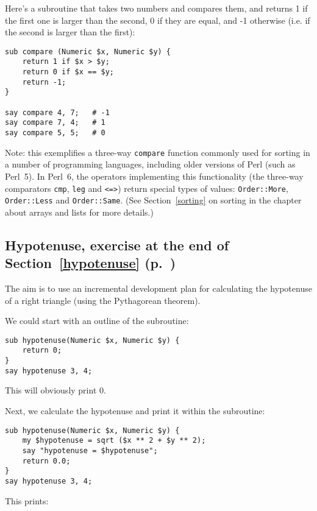 Here's a subroutine that takes two numbers and compares them, 
and returns 1 if the first one is larger than the second, 0 if 
they are equal, and -1 otherwise (i.e. if the second is larger 
than the first):

\begin{verbatim}
sub compare (Numeric $x, Numeric $y) {
    return 1 if $x > $y;
    return 0 if $x == $y;
    return -1;
}

say compare 4, 7;   # -1
say compare 7, 4;   # 1
say compare 5, 5;   # 0
\end{verbatim}

Note: this exemplifies a three-way {\tt compare} function 
commonly used for sorting in a number of programming 
languages, including older versions of Perl (such as 
Perl~5). In Perl~6, the operators implementing this 
functionality (the three-way comparators \verb'cmp', 
\verb'leg' and \verb'<=>') return special types of 
values: {\tt Order::More}, {\tt Order::Less} and 
{\tt Order::Same}. (See Section~\ref{sorting} 
\ifplastex \else
on sorting in the chapter about arrays and lists 
\fi
for more details.)

\subsection{Hypotenuse, exercise at the end of Section~\ref{hypotenuse} (p.~\pageref{hypotenuse})}
\label{sol_hypotenuse}

The aim is to use an incremental development plan for 
calculating the hypotenuse of a right triangle (using 
the Pythagorean theorem). 

We could start with an outline of the subroutine:

\begin{verbatim}
sub hypotenuse(Numeric $x, Numeric $y) {
    return 0;
}
say hypotenuse 3, 4;
\end{verbatim}
%

This will obviously print 0.

Next, we calculate the hypotenuse and print it within the subroutine:

\begin{verbatim}
sub hypotenuse(Numeric $x, Numeric $y) {
    my $hypotenuse = sqrt ($x ** 2 + $y ** 2);
    say "hypotenuse = $hypotenuse";
    return 0.0;
}
say hypotenuse 3, 4;
\end{verbatim}
%

This prints:

